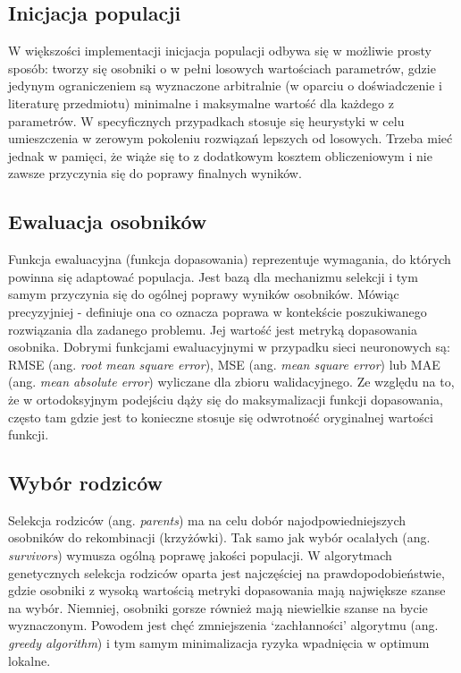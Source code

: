\documentclass[a4paper,11pt]{article}
\begin{document}
    \subsection{Inicjacja populacji}

    W większości implementacji inicjacja populacji odbywa się w możliwie prosty sposób: tworzy się osobniki o w pełni losowych wartościach parametrów, gdzie jedynym ograniczeniem są wyznaczone arbitralnie (w oparciu o doświadczenie i literaturę przedmiotu) minimalne i maksymalne wartość dla każdego z parametrów. W specyficznych przypadkach stosuje się heurystyki w celu umieszczenia w zerowym pokoleniu rozwiązań lepszych od losowych. Trzeba mieć jednak w pamięci, że wiąże się to z dodatkowym kosztem obliczeniowym i nie zawsze przyczynia się do poprawy finalnych wyników\cite{IntroductionToEvolutionaryComputing2015}.

    \subsection{Ewaluacja osobników}

    Funkcja ewaluacyjna (funkcja dopasowania) reprezentuje wymagania, do których powinna się adaptować populacja. Jest bazą dla mechanizmu selekcji i tym samym przyczynia się do ogólnej poprawy wyników osobników. Mówiąc precyzyjniej - definiuje ona co oznacza poprawa w kontekście poszukiwanego rozwiązania dla zadanego problemu. Jej wartość jest metryką dopasowania osobnika\cite{IntroductionToEvolutionaryComputing2015}. Dobrymi funkcjami ewaluacyjnymi w przypadku sieci neuronowych są: RMSE (ang. \textit{root mean square error}), MSE (ang. \textit{mean square error}) lub MAE (ang. \textit{mean absolute error}) wyliczane dla zbioru walidacyjnego. Ze względu na to, że w ortodoksyjnym podejściu dąży się do maksymalizacji funkcji dopasowania, często tam gdzie jest to konieczne stosuje się odwrotność oryginalnej wartości funkcji\cite{IntroductionToEvolutionaryComputing2015}.

    \subsection{Wybór rodziców}

    Selekcja rodziców (ang. \textit{parents}) ma na celu dobór najodpowiedniejszych osobników do rekombinacji (krzyżówki). Tak samo jak wybór ocalałych (ang. \textit{survivors}) wymusza ogólną poprawę jakości populacji. W algorytmach genetycznych selekcja rodziców oparta jest najczęściej na prawdopodobieństwie, gdzie osobniki z wysoką wartością metryki dopasowania mają największe szanse na wybór. Niemniej, osobniki gorsze również mają niewielkie szanse na bycie wyznaczonym. Powodem jest chęć zmniejszenia `zachłanności' algorytmu (ang. \textit{greedy algorithm}) i tym samym minimalizacja ryzyka wpadnięcia w optimum lokalne\cite{IntroductionToEvolutionaryComputing2015}.
\end{document}
